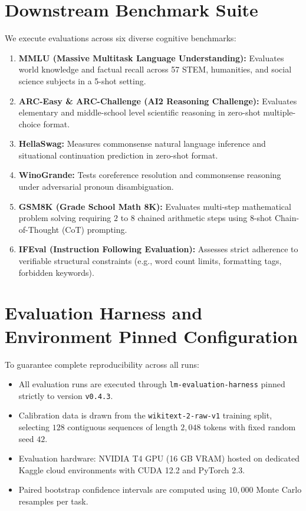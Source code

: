 \documentclass[12pt,a4paper,oneside]{report}
\begin{document}
\section{Downstream Benchmark Suite}
We execute evaluations across six diverse cognitive benchmarks:
\begin{enumerate}[leftmargin=*]
    \item \textbf{MMLU (Massive Multitask Language Understanding):} Evaluates world knowledge and factual recall across 57 STEM, humanities, and social science subjects in a 5-shot setting.
    \item \textbf{ARC-Easy \& ARC-Challenge (AI2 Reasoning Challenge):} Evaluates elementary and middle-school level scientific reasoning in zero-shot multiple-choice format.
    \item \textbf{HellaSwag:} Measures commonsense natural language inference and situational continuation prediction in zero-shot format.
    \item \textbf{WinoGrande:} Tests coreference resolution and commonsense reasoning under adversarial pronoun disambiguation.
    \item \textbf{GSM8K (Grade School Math 8K):} Evaluates multi-step mathematical problem solving requiring $2$ to $8$ chained arithmetic steps using 8-shot Chain-of-Thought (CoT) prompting.
    \item \textbf{IFEval (Instruction Following Evaluation):} Assesses strict adherence to verifiable structural constraints (e.g., word count limits, formatting tags, forbidden keywords).
\end{enumerate}

\section{Evaluation Harness and Environment Pinned Configuration}
To guarantee complete reproducibility across all runs:
\begin{itemize}[leftmargin=*]
    \item All evaluation runs are executed through \texttt{lm-evaluation-harness} pinned strictly to version \texttt{v0.4.3}.
    \item Calibration data is drawn from the \texttt{wikitext-2-raw-v1} training split, selecting $128$ contiguous sequences of length $2,048$ tokens with fixed random seed $42$.
    \item Evaluation hardware: NVIDIA T4 GPU (16 GB VRAM) hosted on dedicated Kaggle cloud environments with CUDA 12.2 and PyTorch 2.3.
    \item Paired bootstrap confidence intervals are computed using $10,000$ Monte Carlo resamples per task.
\end{itemize}
\end{document}
